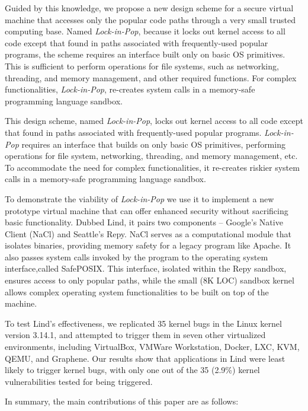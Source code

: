 Guided by this knowledge, we propose a new design scheme for a secure virtual machine that
accesses only the popular code paths through a very small trusted computing base.
Named \emph{Lock-in-Pop}, because it locks out kernel access to all code except
that found in paths associated with frequently-used popular programs, the scheme requires an interface built only on basic OS primitives. This is sufficient to perform operations for file systems, such as
networking, threading, and memory management, and other required functions.
For complex functionalities,  \emph{Lock-in-Pop}, re-creates system calls in
a memory-safe programming language sandbox.

This design scheme, named \emph{Lock-in-Pop}, locks out kernel access to all code except
that found in paths associated with frequently-used popular programs. \emph{Lock-in-Pop}
 requires an interface that builds on only basic OS primitives, performing operations for file system,
networking, threading, and memory management, etc.
To accommodate the need for complex functionalities, it re-creates riskier system calls in
a memory-safe programming language sandbox.

To demonstrate the viability of \emph{Lock-in-Pop} we use it to implement a new
prototype virtual machine that can offer enhanced security without sacrificing
 basic functionality. Dubbed Lind, it pairs two components -- Google's Native Client
(NaCl) and Seattle's Repy. NaCl serves as a computational module that isolates
binaries, providing memory
safety for a legacy program like Apache. It also passes system calls invoked by
 the program to the operating system interface,called SafePOSIX. This interface,
  isolated within the Repy
sandbox, ensures access to only popular paths, while the small (8K LOC) sandbox
 kernel allows complex operating system functionalities to be built on top of the machine.

To test Lind's effectiveness, we replicated 35 kernel bugs in the Linux kernel
version 3.14.1,
and attempted to trigger them in seven other virtualized environments,
including VirtualBox, VMWare Workstation,
Docker, LXC, KVM, QEMU, and Graphene.
Our results show that applications in Lind were least likely to trigger kernel bugs,
with only one out of the 35 (2.9\%) kernel vulnerabilities tested for being triggered.

In summary, the main contributions of this paper are as follows:

